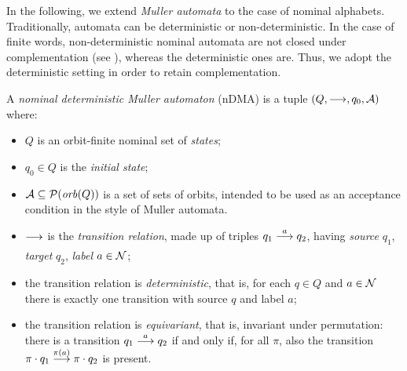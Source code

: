 
In the following, we extend \emph{Muller automata} to the case of nominal alphabets. Traditionally, automata can be deterministic or non-deterministic. In the case of finite words, non-deterministic nominal automata are not closed under complementation (see \cite{TODO}), whereas the deterministic ones are. Thus, we adopt the deterministic setting in order to retain complementation.

\begin{definition}\label{def:ndma}
 A \emph{nominal deterministic Muller automaton} (nDMA) is a tuple $(Q,\overset{}{\longrightarrow},q_0,\mathcal{A})$ where:
 
  \begin{itemize}
  \item $Q$ is an orbit-finite nominal set of \emph{states};
  
  \item $q_0 \in Q$ is the \emph{initial state};
  
  \item $\mathcal{A} \subseteq \mathcal{P}(\mathit{orb}(Q))$ is a set of sets of orbits, intended to be used as an acceptance condition in the style of Muller automata.
  
  \item $\overset{}{\underset{}{\longrightarrow}}$ is the \emph{transition relation}, made up of triples $q_1 \overset{a}{\longrightarrow} q_2$, having \emph{source} $q_1$, \emph{target} $q_2$, \emph{label} $a \in \mathcal{N}$;
  
  \item the transition relation is \emph{deterministic}, that is, for each $q \in Q$ and $a \in \mathcal{N}$ there is exactly one transition with source $q$ and label $a$;
  
  \item the transition relation is \emph{equivariant}, that is, invariant under permutation: there is a transition $q_1 \overset{a}{\longrightarrow} q_2$ if and only if, for all $\pi$, also the transition $\pi \cdot q_1 \overset{\pi(a)}{\longrightarrow} \pi \cdot q_2$ is present.
 \end{itemize}
\end{definition}

